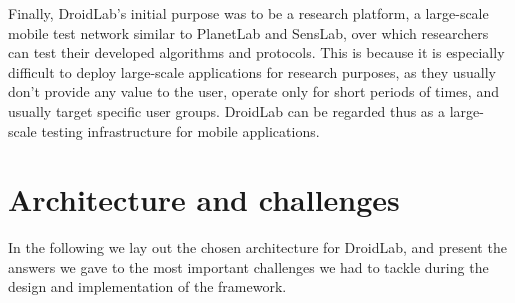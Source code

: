 \documentclass[conference,letterpaper]{IEEEtran}
\begin{document}
\indent Finally, DroidLab's initial purpose was to be a research platform, a large-scale mobile test network similar to PlanetLab and SensLab, over which researchers can test their developed algorithms and protocols. This is because it is especially difficult to deploy large-scale applications for research purposes, as they usually don't provide any value to the user, operate only for short periods of times, and usually target specific user groups. DroidLab can be regarded thus as a large-scale testing infrastructure for mobile applications. \\
\section{Architecture and challenges}
\indent In the following we lay out the chosen architecture for DroidLab, and present the answers we gave to the most important challenges we had to tackle during the design and implementation of the framework.
\end{document}
